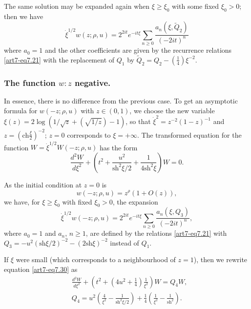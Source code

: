 The same solution may be expanded again when $\xi \geqslant \xi_0$ with some fixed $\xi_0>0$; then we have 
\begin{equation}
\dot{\xi}^{1/2} w(z; \rho , u) = 2^{2 it} e^{-it \xi} \sum\limits_{n \geqslant 0} \frac{a_n(\xi, \tilde{Q}_2)}{(-2 it)^n} \label{art7-eq7.28}
\end{equation}
where $a_0 =1$ and the other coefficients are given by the recurrence relations \eqref{art7-eq7.21} with the replacement of $Q_1$ by $\tilde{Q}_2 =Q_2 - (\frac{1}{4}) \xi^{-2}$.


\setcounter{section}{2}
\subsubsection{The function $w:z$ negative.}\label{art7-subsubsec2.6.5}
In essence, there is no difference from the previous case. To get an asymptotic formula for $w (-z; \rho, u)$ with $z \in (0,1)$, we choose the new variable $\xi(z) =2 \log (1/\sqrt{z} + (\sqrt{1/z})-1)$, so that $\dot{\xi}^2 = z^{-2} (1-z)^{-1}$ and $z = (\text{ch}\frac{\xi}{2})^{-2}$; $z =0$ corresponds to $\xi = + \infty$. The transformed equation for the function $W = \dot{\xi}^{1/2} W(-z; \rho, u)$ has the form 
\setcounter{section}{7}
\setcounter{equation}{29}
\begin{equation}
\frac{d^2 W}{d\xi^2} + \left( t^2 + \frac{u^2}{\text{sh}^2 \xi/2} + \frac{1}{4 \text{sh}^2 \xi}\right) W = 0.  \label{art7-eq7.30}
\end{equation}

As the initial condition at $z =0$ is 
$$
w(-z; \rho, u) = z^\rho (1+ O(z)),
$$
we have, for $\xi \geqslant \xi_0$ with fixed $\xi_0 > 0$, the expansion
\begin{equation}
\dot{\xi}^{1/2} w (-z; \rho, u) = 2^{2 it} e^{-it \xi} \sum\limits_{n \geqslant 0} \frac{a_n(\xi, Q_3)}{(-2 it)^n}, \label{art7-eq7.31}
\end{equation}
where $a_0 =1$ and $a_n$, $n \geqslant 1$, are defined by the relations \eqref{art7-eq7.21} with $Q_3 = - u^2 (\text{sh} \xi/2)^{-2} -(2 \text{sh} \xi)^{-2}$ instead of $Q_1$.

If $\xi$ were small (which corresponds to a neighbourhood of $z =1$), then we rewrite equation \eqref{art7-eq7.30} as
\begin{equation}
\begin{split}
& \frac{d^2 W}{d \xi^2} + \left(t^2+ \left(4u^2 + \frac{1}{4} \right) \frac{1}{\xi^2} \right) W = Q_4 W,\\
& Q_4 = u^2 \left(\frac{4}{\xi^2} -\frac{1}{\text{sh}^2 \xi/2}  \right) + \frac{1}{4} \left(\frac{1}{\xi^2} - \frac{1}{\text{sh}^2} \right) .
\end{split}\label{art7-eq7.32}
\end{equation}

